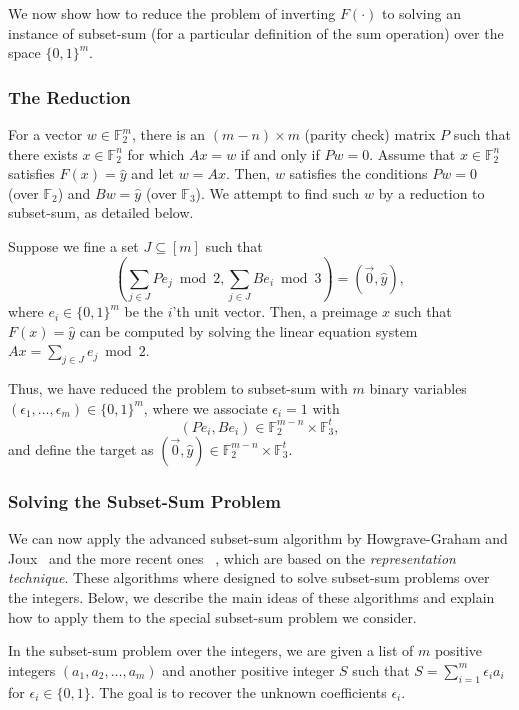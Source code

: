 \documentclass{article}
\begin{document}
We now show how to reduce the problem of inverting $F(\cdot)$ to solving an instance of subset-sum (for a particular definition of the sum operation) over the space $\{0,1\}^m$.

\subsubsection{The Reduction}
For a vector $w \in \mathbb{F}_2^m$, there is an $(m -n) \times m$ (parity check) matrix $P$ such that there exists $x \in \mathbb{F}_2^n$ for which $Ax = w$ if and only if $P w=0$.
Assume that $x \in \mathbb{F}_2^n$ satisfies $F(x) = \hat{y}$ and let $w = Ax$. Then,
$w$ satisfies the conditions $P w = 0$ (over $\mathbb{F}_2$) and $Bw = \hat{y}$ (over $\mathbb{F}_3$).
We attempt to find such $w$ by a reduction to subset-sum, as detailed below.

Suppose we fine a set $J \subseteq [m]$ such that
$$\left( \sum_{j \in J} Pe_j  \bmod 2, \sum_{j \in J} Be_i  \bmod 3 \right) = (\vec{0},\hat{y}),$$
where $e_i \in \{0,1\}^m$ be the $i$'th unit vector.
Then, a preimage $x$ such that $F(x) = \hat{y}$ can be computed by solving the linear equation system
$Ax = \sum_{j \in J} e_j  \bmod 2$.

Thus, we have reduced the problem to subset-sum with $m$ binary variables
$(\epsilon_1, \ldots, \epsilon_m) \in \{0,1\}^m$, where we associate $\epsilon_i = 1$
with $$(Pe_i, Be_i) \in \mathbb{F}_2^{m-n} \times \mathbb{F}_3^t,$$
and define the target
as $(\vec{0},\hat{y}) \in \mathbb{F}_2^{m-n} \times \mathbb{F}_3^t$.

\subsubsection{Solving the Subset-Sum Problem}

We can now apply the advanced subset-sum algorithm by
Howgrave{-}Graham and Joux~\cite{Howgrave-GrahamJ10} and the more recent ones
~\cite{BeckerCJ11,BonnetainBSS20},
which are based on the \emph{representation technique}.
These algorithms where designed to solve subset-sum problems over the integers.
Below, we describe the main ideas of these algorithms
and explain how to apply them to the special subset-sum problem
we consider.

In the subset-sum problem over the integers,
we are given a list of $m$ positive  integers $(a_1,a_2,\ldots,a_m)$
and another positive integer $S$ such that $S = \sum_{i=1}^{m} \epsilon_i a_i$
for $\epsilon_i \in \{0,1\}$. The goal is to recover the unknown coefficients $\epsilon_i$.
\end{document}
